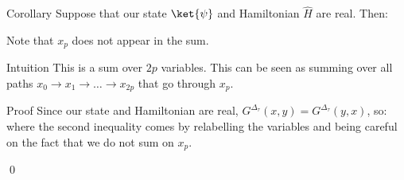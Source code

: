 \documentclass[a4paper]{article}
\begin{document}
\begin{parag}{Corollary}
    Suppose that our state $\ket{\psi}$ and Hamiltonian $\hat{H}$ are real. Then:

    Note that $x_p$ does not appear in the sum.

    \begin{subparag}{Intuition}
        This is a sum over $2p$ variables. This can be seen as summing over all paths $x_0 \to x_1 \to \ldots \to x_{2p}$ that go through $x_p$.
    \end{subparag}

    \begin{subparag}{Proof}
        Since our state and Hamiltonian are real, $G^{\Delta_{\tau}}\left(x, y\right) = G^{\Delta_{\tau}}\left(y, x\right)$, so: 
        where the second inequality comes by relabelling the variables and being careful on the fact that we do not sum on $x_p$.

        \qed
    \end{subparag}
\end{parag}
\end{document}
